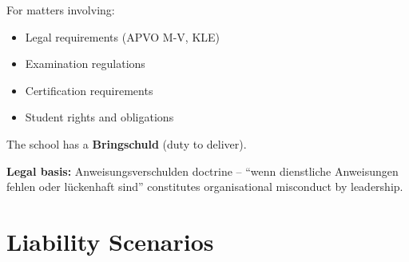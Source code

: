 \documentclass[11pt,a4paper]{article}
\begin{document}
\begin{warningbox}[Critical Regulatory Matters = Bringschuld]
For matters involving:
\begin{itemize}[nosep]
    \item Legal requirements (APVO M-V, KLE)
    \item Examination regulations
    \item Certification requirements
    \item Student rights and obligations
\end{itemize}
The school has a \textbf{Bringschuld} (duty to deliver).

\textbf{Legal basis:} Anweisungsverschulden doctrine -- ``wenn dienstliche Anweisungen fehlen oder lückenhaft sind'' constitutes organisational misconduct by leadership.
\end{warningbox}

\section{Liability Scenarios}
\end{document}
